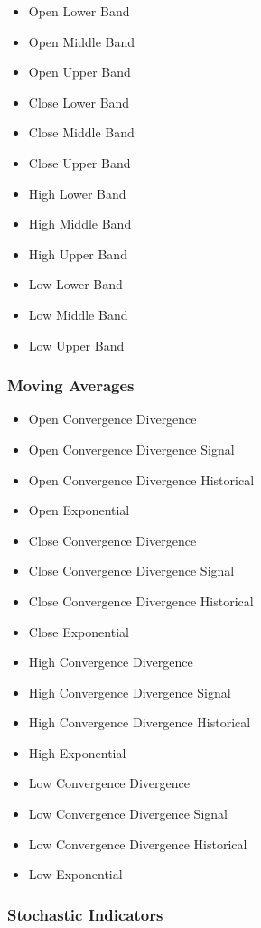 \documentclass[journal]{IEEEtran}
\begin{document}
\begin{itemize}
	\item Open Lower Band
	\item Open Middle Band
	\item Open Upper Band
	\item Close Lower Band
	\item Close Middle Band
	\item Close Upper Band
	\item High Lower Band
	\item High Middle Band
	\item High Upper Band
	\item Low Lower Band
	\item Low Middle Band
	\item Low Upper Band
\end{itemize}

\subsubsection{Moving Averages}

\begin{itemize}
	\item Open Convergence Divergence
	\item Open Convergence Divergence Signal
	\item Open Convergence Divergence Historical
	\item Open Exponential
	\item Close Convergence Divergence
	\item Close Convergence Divergence Signal
	\item Close Convergence Divergence Historical
	\item Close Exponential
	\item High Convergence Divergence 
	\item High Convergence Divergence Signal
	\item High Convergence Divergence Historical
	\item High Exponential
	\item Low Convergence Divergence
	\item Low Convergence Divergence Signal
	\item Low Convergence Divergence Historical
	\item Low Exponential
\end{itemize}

\subsubsection{Stochastic Indicators}
\end{document}
